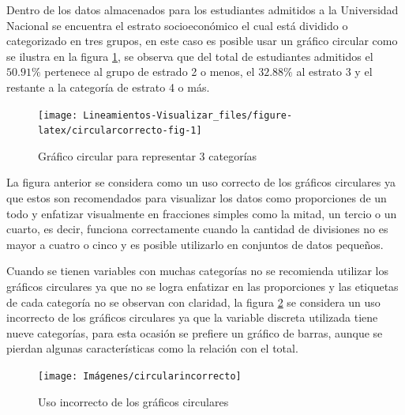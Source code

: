 \documentclass[
]{book}
\begin{document}
Dentro de los datos almacenados para los estudiantes admitidos a la Universidad Nacional se encuentra el estrato socioeconómico el cual está dividido o categorizado en tres grupos, en este caso es posible usar un gráfico circular como se ilustra en la figura \ref{fig:circularcorrecto-fig}, se observa que del total de estudiantes admitidos el \(50.91\%\) pertenece al grupo de estrado 2 o menos, el \(32.88\%\) al estrato 3 y el restante a la categoría de estrato 4 o más.

\begin{figure}

{\centering \texttt{[image: Lineamientos-Visualizar\_files/figure-latex/circularcorrecto-fig-1]} 

}

\caption{Gráfico circular para representar 3 categorías}\label{fig:circularcorrecto-fig}
\end{figure}

La figura anterior se considera como un uso correcto de los gráficos circulares ya que estos son recomendados para visualizar los datos como proporciones de un todo y enfatizar visualmente en fracciones simples como la mitad, un tercio o un cuarto, es decir, funciona correctamente cuando la cantidad de divisiones no es mayor a cuatro o cinco y es posible utilizarlo en conjuntos de datos pequeños.

Cuando se tienen variables con muchas categorías no se recomienda utilizar los gráficos circulares ya que no se logra enfatizar en las proporciones y las etiquetas de cada categoría no se observan con claridad, la figura \ref{fig:circularincorrecto-fig} se considera un uso incorrecto de los gráficos circulares ya que la variable discreta utilizada tiene nueve categorías, para esta ocasión se prefiere un gráfico de barras, aunque se pierdan algunas características como la relación con el total.

\begin{figure}

{\centering \texttt{[image: Imágenes/circularincorrecto]} 

}

\caption{Uso incorrecto de los gráficos circulares}\label{fig:circularincorrecto-fig}
\end{figure}
\end{document}
